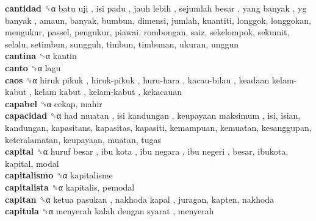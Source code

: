 \textbf{cantidad} ␝α   batu uji ,  isi padu ,  jauh lebih ,  sejumlah besar ,  yang banyak ,  yg banyak , amaun, banyak, bumbun, dimensi, jumlah, kuantiti, longgok, longgokan, mengukur, passel, pengukur, piawai, rombongan, saiz, sekelompok, sekumit, selalu, setimbun, sungguh, timbun, timbunan, ukuran, unggun  \\
\textbf{cantina} ␝α  kantin  \\
\textbf{canto} ␝α  lagu  \\
\textbf{caos} ␝α   hiruk pikuk ,  hiruk-pikuk ,  huru-hara ,  kacau-bilau ,  keadaan kelam-kabut ,  kelam kabut ,  kelam-kabut , kekacauan  \\
\textbf{capabel} ␝α  cekap, mahir  \\
\textbf{capacidad} ␝α   had muatan ,  isi kandungan ,  keupayaan maksimum , isi, isian, kandungan, kapasitans, kapasitas, kapasiti, kemampuan, kemuatan, kesanggupan, keteralamatan, keupayaan, muatan, tugas  \\
\textbf{capital} ␝α   huruf besar ,  ibu kota ,  ibu negara ,  ibu negeri , besar, ibukota, kapital, modal  \\
\textbf{capitalismo} ␝α  kapitalisme  \\
\textbf{capitalista} ␝α  kapitalis, pemodal  \\
\textbf{capitan} ␝α   ketua pasukan ,  nakhoda kapal , juragan, kapten, nakhoda  \\
\textbf{capitula} ␝α   menyerah kalah dengan syarat , menyerah  \\
